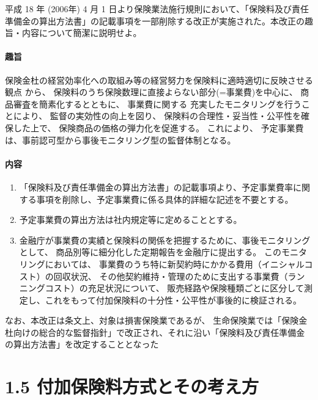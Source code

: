 \documentclass[report,gutter=10mm,fore-edge=10mm,uplatex,dvipdfmx]{jlreq}
\begin{document}

平成 18 年 (2006年) 4 月 1
日より保険業法施行規則において、「保険料及び責任準備金の算出方法書」の記載事項を一部削除する改正が実施された。本改正の趣旨・内容について簡潔に説明せよ。


\paragraph{趣旨}

  保険金杜の経営効率化への取組み等の経営努力を保険料に適時適切に反映させる観点
から、 保険料のうち保険数理に直接よらない部分(=事業費)を中心に、
商品審査を簡素化するとともに、
事業費に関する      充実したモニタリングを行うことにより、
  監督の実効性の向上を図り、
  保険料の合理性・妥当性・公平性を確保した上で、
  保険商品の価格の弾力化を促進する。
これにより、  予定事業費は、事前認可型から事後モニタリング型の監督体制となる。

\paragraph{内容}

\begin{enumerate}
\tightlist
\item
  「保険料及び責任準備金の算出方法書」の記載事項より、予定事業費率に関する事項を削除し、予定事業費に係る具体的詳細な記述を不要とする。
\item
  予定事業費の算出方法は社内規定等に定めることとする。
\item
  金融庁が事業費の実績と保険料の関係を把握するために、事後モニタリングとして、
    商品別等に細分化した定期報告を金融庁に提出する。
    このモニタリングにおいては、
      事業費のうち特に新契約時にかかる費用（イニシャルコスト）の回収状況、
      その他契約維持・管理のために支出する事業費（ランニングコスト）の充足状況について、
販売経路や保険種類ごとに区分して測定し、これをもって付加保険料の十分性・公平性が事後的に検証される。
\end{enumerate}

  なお、本改正は条文上、対象は損害保険業であるが、
  生命保険業では「保険金杜向けの総合的な監督指針」で改正され、それに沿い「保険料及び責任準備金の算出方法書」を改定することとなった


\section{1.5
付加保険料方式とその考え方}
\end{document}
